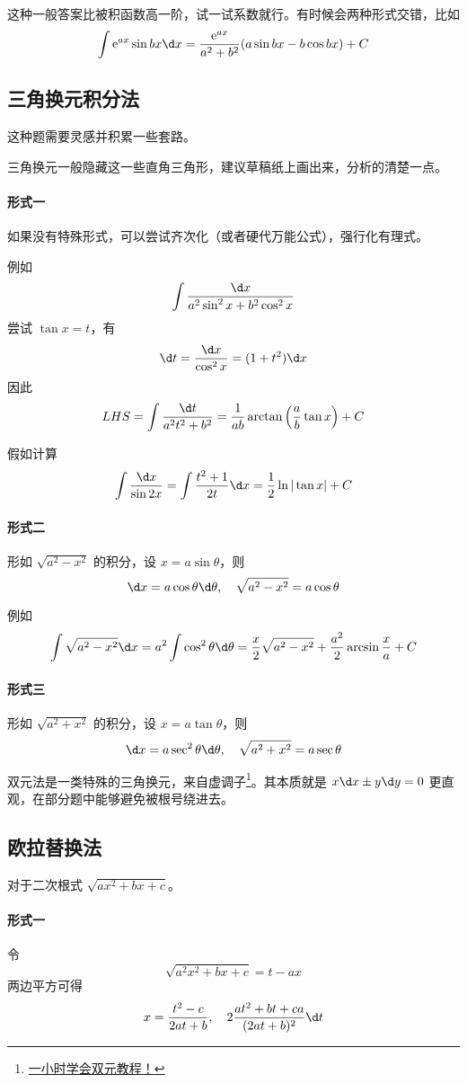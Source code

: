 这种一般答案比被积函数高一阶，试一试系数就行。有时候会两种形式交错，比如
\[ \int \ee^{ax} \sin bx \d x = \frac{\ee^{ax}}{a^2+b^2} (a \sin bx - b \cos bx) + C\]


\subsection{三角换元积分法}

这种题需要灵感并积累一些套路。

三角换元一般隐藏这一些直角三角形，建议草稿纸上画出来，分析的清楚一点。

\paragraph{形式一} 如果没有特殊形式，可以尝试齐次化（或者硬代万能公式），强行化有理式。

例如
\[ \int \frac{\d x}{a^2 \sin^2 x + b^2 \cos^2 x} \]
尝试 $\tan x = t$，有
\[ \d t = \frac{\d x}{\cos^2 x} = (1 + t^2) \d x \]
因此
\[ LHS = \int \frac{\d t}{a^2 t^2 + b^2} = \frac{1}{ab} \arctan \left( \frac{a}{b} \tan x \right) + C \]


假如计算
\[ \int \frac{\d x}{\sin 2x} = \int \frac{t^2+1}{2t} \d x = \frac{1}{2} \ln | \tan x| + C \]


\paragraph{形式二} 形如 $\sqrt{a^2 - x^2}$ 的积分，设 $x = a \sin \theta$，则
\[ \d x = a \cos \theta \d \theta, \quad \sqrt{a^2 - x^2} = a \cos \theta \]

例如
\[ \int \sqrt{a^2 - x^2} \d x = a^2 \int \cos^2 \theta \d \theta = \frac{x}{2}\sqrt{a^2 - x^2} + \frac{a^2}{2} \arcsin \frac{x}{a} + C \]

\paragraph{形式三} 形如 $\sqrt{a^2 + x^2}$ 的积分，设 $x = a \tan \theta$，则
\[ \d x = a \sec^2 \theta \d \theta, \quad \sqrt{a^2+x^2} = a \sec \theta \]

双元法是一类特殊的三角换元，来自虚调子\footnote{\href{https://zhuanlan.zhihu.com/p/443599480}{一小时学会双元教程！}}。其本质就是 $x\d x \pm y \d y = 0$ 更直观，在部分题中能够避免被根号绕进去。

\subsection{欧拉替换法}

对于二次根式 $\sqrt{a x^2 + b x + c}$。

\paragraph{形式一} 令
\[ \sqrt{a^2x^2+bx+c} = t - ax \]
两边平方可得
\[ x = \frac{t^2 - c}{2at + b}, \quad 2\frac{at^2 + bt + ca}{(2at+b)^2} \d t \]

